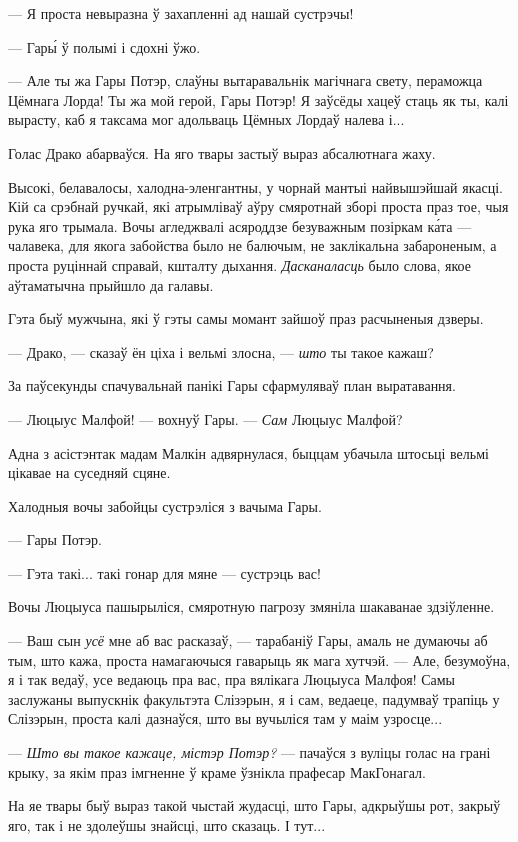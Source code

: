 --- Я проста невыразна ў захапленні ад нашай сустрэчы!

--- Гар\'ы ў полымі і сдохні ўжо.

--- Але ты жа Гары Потэр, слаўны вытаравальнік магічнага свету, пераможца Цёмнага Лорда!
Ты жа мой герой, Гары Потэр! Я заўсёды хацеў стаць як ты, калі вырасту, каб я таксама 
мог адольваць Цёмных Лордаў налева і...

Голас Драко абарваўся. На яго твары застыў выраз абсалютнага жаху.

Высокі, белавалосы, халодна-эленгантны, у чорнай мантыі найвышэйшай якасці.
Кій са срэбнай ручкай, які атрымліваў аўру смяротнай зборі проста праз тое, чыя рука яго
трымала. Вочы агледжвалі асяроддзе безуважным позіркам к\'ата --- чалавека,
для якога забойства было не балючым, не заклікальна забароненым, а проста
руціннай справай, кшталту дыхання. \emph{Дасканаласць} было слова, якое аўтаматычна
прыйшло да галавы.

Гэта быў мужчына, які ў гэты самы момант зайшоў праз расчыненыя дзверы.

--- Драко, --- сказаў ён ціха і вельмі злосна, --- \emph{што} ты такое кажаш?

За паўсекунды спачувальнай панікі Гары сфармуляваў план выратавання.

--- Люцыус Малфой! --- вохнуў Гары. --- \emph{Сам} Люцыус Малфой?

Адна з асістэнтак мадам Малкін адвярнулася, быццам убачыла штосьці вельмі цікавае на суседняй
сцяне.

Халодныя вочы забойцы сустрэліся з вачыма Гары.

--- Гары Потэр.

--- Гэта такі... такі гонар для мяне --- сустрэць вас!

Вочы Люцыуса пашырыліся, смяротную пагрозу змяніла шакаванае здзіўленне.

--- Ваш сын \emph{усё} мне аб вас расказаў, --- тарабаніў Гары, амаль не думаючы аб тым, што
кажа, проста намагаючыся гаварыць як мага хутчэй. --- Але, безумоўна, я і так ведаў, усе ведаюць
пра вас, пра вялікага Люцыуса Малфоя! Самы заслужаны выпускнік факультэта Слізэрын, я і сам,
ведаеце, падумваў трапіць у Слізэрын, проста калі дазнаўся, што вы вучыліся там 
у маім узросце... 

--- \emph{Што вы такое кажаце, містэр Потэр?} --- пачаўся з вуліцы голас на грані крыку, за 
якім праз імгненне ў краме ўзнікла прафесар МакГонагал.

На яе твары быў выраз такой чыстай жудасці, што Гары, адкрыўшы рот, закрыў яго, так і не здолеўшы
знайсці, што сказаць. І тут...

